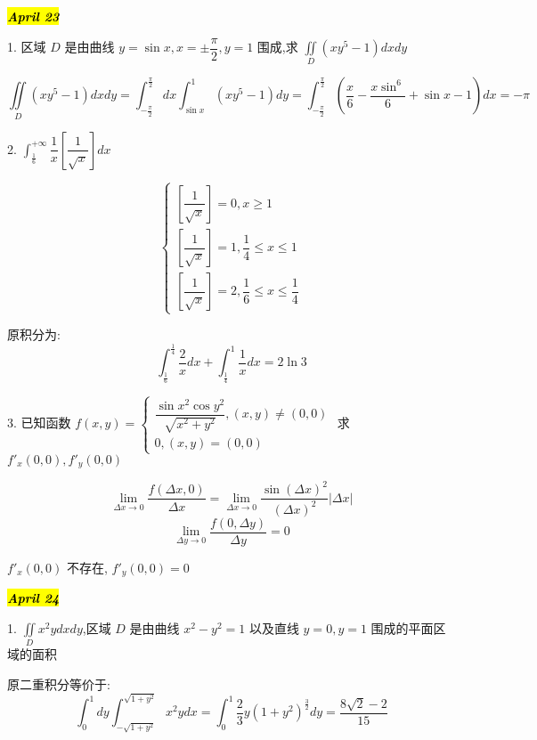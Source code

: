 
\hl{\textbf{\textit{April 23}}}

1. 区域 $D$ 是由曲线 $y=\sin x,x=\pm\dfrac{\pi}{2},y=1$ 围成,求 $\iint\limits_{D}(xy^{5}-1)dxdy$

\begin{solution}
	
	$$\iint\limits_{D}(xy^{5}-1)dxdy=\int_{-\frac{\pi}{2}}^{\frac{\pi}{2}}dx\int_{\sin x}^{1}(xy^5-1)dy=\int_{-\frac{\pi}{2}}^{\frac{\pi}{2}}\left( \dfrac{x}{6}-\dfrac{x\sin^{6}}{6}+\sin x-1\right) dx=-\pi$$
\end{solution}


2. 	$\int_{\frac{1}{6}}^{+\infty}\dfrac{1}{x}\left[ \dfrac{1}{\sqrt{x}}\right]dx$
\begin{solution}
	
	$$\left\lbrace
	\begin{array}{l}
		\left[ \dfrac{1}{\sqrt{x}}\right]=0,x\geq 1\\
		\left[ \dfrac{1}{\sqrt{x}}\right]=1,\dfrac{1}{4}\leq x\leq 1\\
		\left[ \dfrac{1}{\sqrt{x}}\right]=2,\dfrac{1}{6}\leq x\leq \dfrac{1}{4}
	\end{array}\right. $$
	
	原积分为: 
	$$\int_{\frac{1}{6}}^{\frac{1}{4}}\dfrac{2}{x}dx+\int_{\frac{1}{4}}^{1}\dfrac{1}{x}dx=2\ln 3$$
\end{solution}


3. 已知函数 $f(x,y)=\left\lbrace \begin{array}{l}
	\dfrac{\sin x^2\cos y^2}{\sqrt{x^2+y^2}},(x,y)\neq (0,0)\\
	0,(x,y)=(0,0)
\end{array}\right. $ 求 $f'_{x}(0,0),f'_{y}(0,0)$
\begin{solution}
	
	$$\lim\limits_{\Delta x\rightarrow 0}\frac{f(\Delta x,0)}{\Delta x}=\lim\limits_{\Delta x\rightarrow 0}\frac{\sin (\Delta x)^2}{(\Delta x)^2}|\Delta x|$$
	$$\lim\limits_{\Delta y\rightarrow 0}\frac{f(0,\Delta y)}{\Delta y}=0$$
	
	$f'_{x}(0,0)$ 不存在, $f'_{y}(0,0)=0$
\end{solution}


\hl{\textbf{\textit{April 24}}}

1. $\iint\limits_{D}x^2ydxdy$,区域 $D$ 是由曲线 $x^2-y^2=1$ 以及直线 $y=0,y=1$ 围成的平面区域的面积
\begin{solution}
	
	原二重积分等价于: 
	$$\int_{0}^{1}dy\int_{-\sqrt{1+y^2}}^{\sqrt{1+y^2}}x^2ydx=\int_{0}^{1}\dfrac{2}{3}y(1+y^2)^{\frac{3}{2}}dy=\dfrac{8\sqrt{2}-2}{15}$$
\end{solution}

